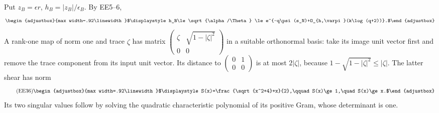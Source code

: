 \documentclass[10pt]{article}
\begin{document}
Put \(z_B=\epsilon r\), \(h_B=|z_B|/\epsilon_B\). By EE5--6, 
\begin{equation*}
\begin{adjustbox}{max width=.92\linewidth}$\displaystyle h_B\le\sqrt{\alpha/\Theta}
\le e^{-q\psi(s_N)+O_{h,\varpi}(k\log(q+2))}.$\end{adjustbox}
\end{equation*}
 A rank-one map of norm one and trace \(\zeta\) has matrix \(\left(\begin{smallmatrix}\zeta&\sqrt{1-|\zeta|^2}\\0&0\end{smallmatrix}\right)\) in a suitable orthonormal basis: take its image unit vector first and remove the trace component from its input unit vector. Its distance to \(\left(\begin{smallmatrix}0&1\\0&0\end{smallmatrix}\right)\) is at most \(2|\zeta|\), because \(1-\sqrt{1-|\zeta|^2}\le|\zeta|\). The latter shear has norm 
\begin{equation*}
\tag{EE36}
\begin{adjustbox}{max width=.92\linewidth}$\displaystyle S(x)=\frac{\sqrt{x^2+4}+x}{2},\qquad
S(x)\ge1,\quad S(x)\ge x.$\end{adjustbox}
\end{equation*}
 Its two singular values follow by solving the quadratic characteristic polynomial of its positive Gram, whose determinant is one.
\end{document}
